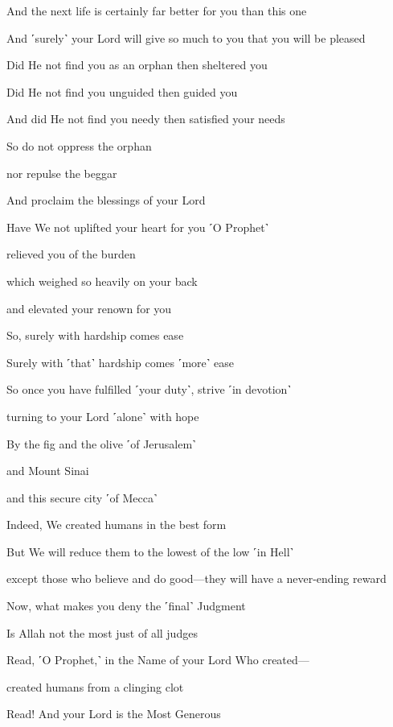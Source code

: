 And the next life is certainly far better for you than this one

And ˹surely˺ your Lord will give so much to you that you will be pleased

Did He not find you as an orphan then sheltered you

Did He not find you unguided then guided you

And did He not find you needy then satisfied your needs

So do not oppress the orphan

nor repulse the beggar

And proclaim the blessings of your Lord

Have We not uplifted your heart for you ˹O Prophet˺

relieved you of the burden

which weighed so heavily on your back

and elevated your renown for you

So, surely with hardship comes ease

Surely with ˹that˺ hardship comes ˹more˺ ease

So once you have fulfilled ˹your duty˺, strive ˹in devotion˺

turning to your Lord ˹alone˺ with hope

By the fig and the olive ˹of Jerusalem˺

and Mount Sinai

and this secure city ˹of Mecca˺

Indeed, We created humans in the best form

But We will reduce them to the lowest of the low ˹in Hell˺

except those who believe and do good—they will have a never-ending reward

Now, what makes you deny the ˹final˺ Judgment

Is Allah not the most just of all judges

Read, ˹O Prophet,˺ in the Name of your Lord Who created—

created humans from a clinging clot

Read! And your Lord is the Most Generous

